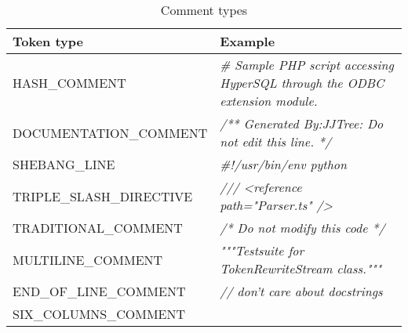 \setlength{\extrarowheight}{.5em}
\begin{table}[H]
	\caption{Comment types}
	\label{table:commentTypes}
	\begin{tabularx}{\textwidth}{l|L}
		\textbf{Token type} & \textbf{Example} \\
		\hline
		HASH\_COMMENT & \textit{\# Sample PHP script accessing HyperSQL through the ODBC extension module.}\\ 
		DOCUMENTATION\_COMMENT & \textit{/** Generated By:JJTree: Do not edit this line. */} \\ 
		SHEBANG\_LINE & \textit{\#!/usr/bin/env python } \\ 
		TRIPLE\_SLASH\_DIRECTIVE & \textit{/// <reference path="Parser.ts" />} \\ 
		TRADITIONAL\_COMMENT & \textit{/* Do not modify this code */} \\ 
		MULTILINE\_COMMENT & \textit{"""Testsuite for TokenRewriteStream class."""} \\ 
		END\_OF\_LINE\_COMMENT & \textit{// don't care about docstrings} \\ 
		SIX\_COLUMNS\_COMMENT &  \\ 
	\end{tabularx} 
\end{table}
\setlength{\extrarowheight}{0em}